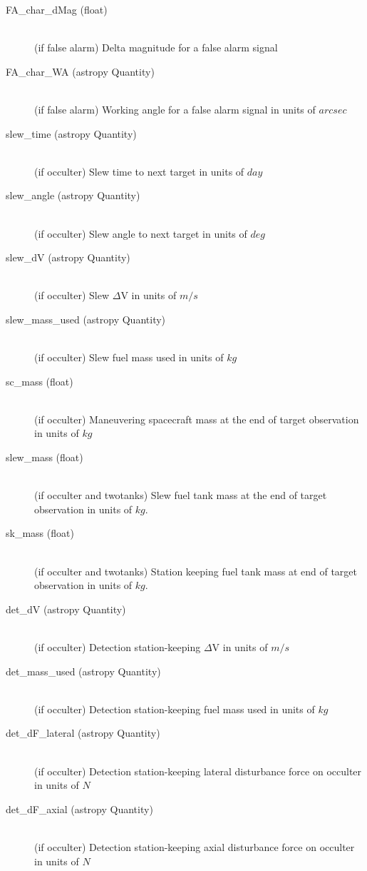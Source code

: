 \documentclass[cleanfoot]{asme2ej}
\begin{document}
\begin{itemize}
\begin{description}
\begin{description}
        \item[FA\_char\_dMag (float)] \hfill \\ (if false alarm) Delta magnitude for a false alarm signal
        \item[FA\_char\_WA (astropy Quantity)] \hfill \\ (if false alarm) Working angle for a false alarm signal in units of $arcsec$
        \item[slew\_time (astropy Quantity)] \hfill \\ (if occulter) Slew time to next target in units of $ day $
        \item[slew\_angle (astropy Quantity)] \hfill \\ (if occulter) Slew angle to next target in units of $ deg $
        \item[slew\_dV (astropy Quantity)] \hfill \\ (if occulter) Slew $\Delta$V in units of $ m/s $
        \item[slew\_mass\_used (astropy Quantity)] \hfill \\ (if occulter) Slew fuel mass used in units of $ kg $
        \item[sc\_mass (float)] \hfill \\ (if occulter) Maneuvering spacecraft mass at the end of target observation in units of $kg$
        \item[slew\_mass (float)] \hfill \\ (if occulter and twotanks) Slew fuel tank mass at the end of target observation in units of $kg$.
        \item[sk\_mass (float)] \hfill \\ (if occulter and twotanks) Station keeping fuel tank mass at end of target observation in units of $kg$.
        \item[det\_dV (astropy Quantity)] \hfill \\ (if occulter) Detection station-keeping $\Delta$V in units of $ m/s $
        \item[det\_mass\_used (astropy Quantity)] \hfill \\ (if occulter) Detection station-keeping fuel mass used in units of $ kg $
        \item[det\_dF\_lateral (astropy Quantity)] \hfill \\ (if occulter) Detection station-keeping lateral disturbance force on occulter in units of $ N $
        \item[det\_dF\_axial (astropy Quantity)] \hfill \\ (if occulter) Detection station-keeping axial disturbance force on occulter in units of $ N $

\end{description}
\end{description}
\end{itemize}
\end{document}
